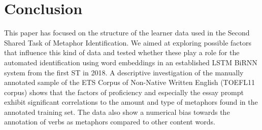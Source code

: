 \documentclass[11pt,a4paper]{article}
\begin{document}



\section{Conclusion}

This paper has focused on the structure of the learner data used in the Second Shared Task of Metaphor Identification. We aimed at exploring possible factors that influence this kind of data and tested whether these play a role for the automated identification using word embeddings in an established LSTM BiRNN system from the first ST in 2018. A descriptive investigation of the manually annotated sample of the ETS Corpus of Non-Native Written English (TOEFL11 corpus) shows that the factors of proficiency and especially the essay prompt exhibit significant correlations to the amount and type of metaphors found in the annotated training set. The data also show a numerical bias towards the annotation of verbs as metaphors compared to other content words.
\end{document}
